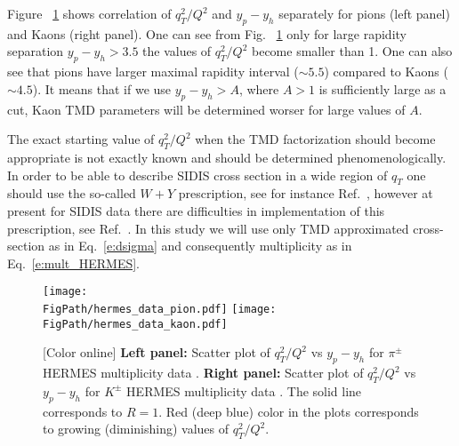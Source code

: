 \documentclass[final,3p,times,onecolumn,sort&compress,hidelinks]{elsarticle}
\newcommand*{\FigPath}{../Figs/}%
\begin{document}
Figure ~\ref{Fig:hermes_data_R} shows correlation of $q_T^2/Q^2$ and $y_p-y_h$ separately for pions (left panel) and Kaons (right panel).
One can see from Fig. ~\ref{Fig:hermes_data_R} only for large rapidity separation $y_p-y_h > 3.5$ the values of $q_T^2/Q^2$ become smaller than 1.  One can also see that pions have larger maximal rapidity interval ($\sim 5.5$) compared to Kaons ($\sim 4.5$). It means that if we use 
$y_p-y_h>A$, where $A> 1$ is sufficiently large as a cut, Kaon TMD parameters will be determined worser for large values of $A$.

The exact starting value of $q_T^2/Q^2$ when the TMD factorization should become appropriate is not exactly known and should be determined phenomenologically. In order to be able to describe SIDIS cross section in a wide region of $q_T$ one should use the so-called $W+Y$ prescription, see for instance Ref.~\cite{Collins:2016hqq}, however at present for SIDIS data there are difficulties in implementation of this prescription, see Ref.~\cite{Gonzalez-Hernandez:2018ipj}. In this study we will use only TMD approximated cross-section as in Eq.~\eqref{e:dsigma} and consequently multiplicity as in Eq.~\eqref{e:mult_HERMES}. 


 
\begin{figure}[htb!]
\centering
\texttt{[image: \\FigPath/hermes\_data\_pion.pdf]}
\texttt{[image: \\FigPath/hermes\_data\_kaon.pdf]}
\caption{\label{Fig:hermes_data_R}
[Color online] {\bf Left panel:} Scatter plot of $q_T^2/Q^2$ vs $y_p-y_h$ for $\pi^\pm$ HERMES multiplicity data . {\bf Right panel:} 
Scatter plot of $q_T^2/Q^2$ vs $y_p-y_h$ for $K^\pm$ HERMES multiplicity data . The solid line corresponds to $R=1$. Red (deep blue) color in the plots corresponds to growing (diminishing) values of $q_T^2/Q^2$.
}
\end{figure}
\end{document}
